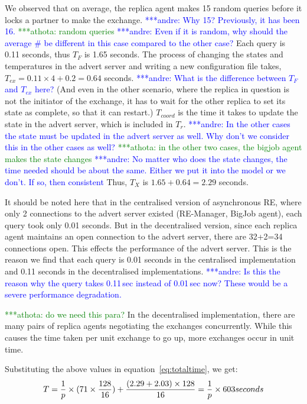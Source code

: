 \documentclass{rspublic}
\newcommand{\alnote}[1]{ {\textcolor{blue} { ***andre: #1 }}}
\newcommand{\athotanote}[1]{ {\textcolor{green} { ***athota: #1 }}}
\newcommand{\alnote}[1]{}
\newcommand{\athotanote}[1]{}
\begin{document}
We observed that on average, the replica agent makes 15 random queries before
it locks a partner to make the exchange. \alnote{Why 15? Previously, it has been 16.} \athotanote{random queries} \alnote{Even if it is random, why should the average \# be different in this case compared to the other case?}
Each query is 0.11 seconds, thus $T_F$ is 1.65
seconds. The process of changing the states
and temperatures in the advert server and writing a new
configuration file takes, $T_{ex} = 0.11\times 4 +0.2 = 0.64$ seconds.
\alnote{What is the difference between $T_F$ and $T_{ex}$ here?} 
(And even in the other scenario, where the replica in question is not the
initiator of the exchange, it has to wait for the other replica to set its state as complete, so that it can restart.) $T_{coord}$ is the time it takes to
update the state in the advert server, which is included in $T_r$. \alnote{In the other
cases the state must be updated in the advert server as well. Why don't we consider
this in the other cases as well?}\athotanote{in the other two cases, the bigjob agent makes the state changes} \alnote{No matter who does the state changes, the time needed should be about the same. Either we put it into the model or we don't. If so, then consistent} Thus, $T_{X}$ is $1.65+0.64= 2.29$ seconds.

It should be noted here that in the centralised version of
asynchronous RE, where only 2 connections to the advert server existed
(RE-Manager, BigJob agent), each query took only 0.01 seconds. But in
the decentralised version, since each replica agent maintains an open
connection to the advert server, there are 32+2=34 connections
open. This effects the performance of the advert server. This is the reason we find that each query is 0.01 seconds in the centralised implementation and 0.11 seconds in the decentralised implementations. \alnote{Is this the reason why
the query takes 0.11\,sec instead of 0.01\,sec now? These would be a severe performance
degradation.}

\athotanote{ do we need this para?}In the decentralised implementation, there are many pairs of
replica agents negotiating the exchanges concurrently. While this
causes the time taken per unit exchange to go up, more exchanges occur
in unit time.

Substituting the above values in equation~\ref{eq:totaltime}, we get:
\begin{eqnarray}
T=  {1 \over p} \times {{(71\times {128\over 16}}) + {(2.29+2.03)\times 128\over 16}} = {1 \over p} \times 603 seconds
\label{eq:decent}
\end{eqnarray}
\end{document}
